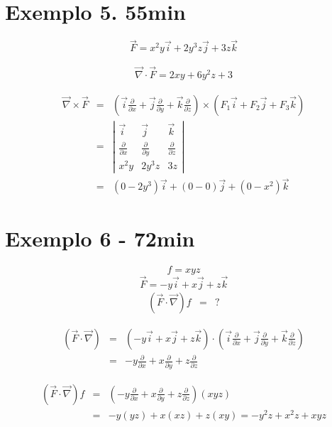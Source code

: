\documentclass[a4paper,10pt]{book}
\begin{document}
 \section{Exemplo 5. 55min}

 $$\vec{F}=x^2y\vec{i}+2y^3z\vec{j}+3z\vec{k} $$
 
 \begin{eqnarray*}
  \vec{\nabla}\cdot\vec{F}=2xy+6y^2z+3
 \end{eqnarray*}

  \begin{eqnarray*}
\vec{\nabla}\times\vec{F}&=&\left(\vec{i}\frac{\partial}{\partial x}+\vec{j}\frac{\partial}{\partial y}+\vec{k}\frac{\partial}{\partial z}\right)\times\left(F_1\vec{i}+F_2\vec{j}+F_3\vec{k}\right)\\
&=&\left|
\begin{array}{ccc}
\vec{i}&\vec{j}&\vec{k} \\[.2cm]
\frac{\partial}{\partial x } & \frac{\partial}{\partial y } &\frac{\partial}{\partial z } \\[.2cm]
x^2y&2y^3z&3z
\end{array}
\right|\\
&=&\left(0-2y^3\right)\vec{i}+\left(0-0\right)\vec{j}+\left(0-x^2\right)\vec{k}
 \end{eqnarray*}

 
\section{Exemplo 6 - 72min}
$$f=xyz$$
$$\vec{F}=-y\vec{i}+x\vec{j}+z\vec{k} $$
\begin{eqnarray*}
 (\vec{F}\cdot\vec{\nabla})f&=&?
\end{eqnarray*}

\begin{eqnarray*}
 (\vec{F}\cdot\vec{\nabla})&=&\left(-y\vec{i}+x\vec{j}+z\vec{k}\right)\cdot\left(\vec{i}\frac{\partial}{\partial x}+\vec{j}\frac{\partial}{\partial y}+\vec{k}\frac{\partial}{\partial z}\right)\\
 &=&-y\frac{\partial}{\partial x}+x\frac{\partial}{\partial y} + z \frac{\partial}{\partial z}
\end{eqnarray*}


\begin{eqnarray*}
 (\vec{F}\cdot\vec{\nabla})f&=&\left(-y\frac{\partial}{\partial x}+x\frac{\partial}{\partial y} + z \frac{\partial}{\partial z}\right)(xyz)\\
 &=&-y(yz)+x(xz)+z(xy)=-y^2z+x^2z+xyz
\end{eqnarray*}
\end{document}
